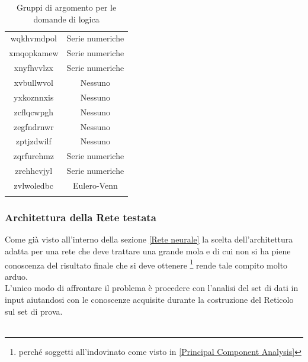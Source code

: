 \begin{longtable}{|c|c|}
wqkhvmdpol & Serie numeriche \\
xmqopkamew & Serie numeriche \\
xnyfhvvlzx & Serie numeriche \\
xvbullwvol & Nessuno \\
yxkoznnxis & Nessuno \\
zcflqcwpgh & Nessuno \\
zegfndrnwr & Nessuno \\
zptjzdwilf & Nessuno \\
zqrfurehmz & Serie numeriche \\
zrehhcvjyl & Serie numeriche \\
zvlwoledbc & Eulero-Venn \\
\hline
	
\caption{Gruppi di argomento per le domande di logica}\label{tab:Gruppi di argomento per le domande di logica}
\end{longtable}

\subsubsection{Architettura della Rete testata}
\label{Architettura della Rete testata 89}
Come già visto all'interno della sezione \ref{Rete neurale} la scelta dell'architettura adatta per una rete che deve trattare una grande mola e di cui non si ha piene conoscenza del risultato finale che si deve ottenere \footnote{perché soggetti all'indovinato come visto in \ref{Principal Component Analysis}} rende tale compito molto arduo.\\
L'unico modo di affrontare il problema è procedere con l'analisi del set di dati in input aiutandosi con le conoscenze acquisite durante la costruzione del Reticolo sul set di prova.\\\\

